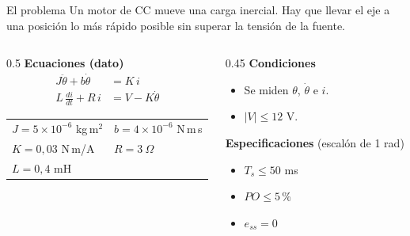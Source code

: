 \documentclass[11pt,aspectratio=169]{beamer}
\begin{document}
\begin{frame}{El problema}
  Un motor de CC mueve una carga inercial. Hay que llevar el eje a una posición
  lo más rápido posible sin superar la tensión de la fuente.

  \vspace{0.8em}
  \begin{columns}[T]
    \begin{column}{0.5\textwidth}
      \textbf{Ecuaciones (dato)}
      \begin{align*}
        J\ddot\theta + b\dot\theta &= K\,i\\
        L\,\frac{di}{dt} + R\,i &= V - K\dot\theta
      \end{align*}
      \small
      \begin{tabular}{@{}ll@{}}
        $J = 5\times10^{-6}$ kg\,m$^2$ & $b = 4\times10^{-6}$ N\,m\,s\\
        $K = 0{,}03$ N\,m/A & $R = 3\ \Omega$\\
        $L = 0{,}4$ mH &
      \end{tabular}
    \end{column}
    \begin{column}{0.45\textwidth}
      \textbf{Condiciones}
      \begin{itemize}
        \item Se miden $\theta$, $\dot\theta$ e $i$.
        \item $|V| \le 12$ V.
      \end{itemize}
      \vspace{0.5em}
      \textbf{Especificaciones} (escalón de 1 rad)
      \begin{itemize}
        \item $T_s \le 50$ ms
        \item $PO \le 5$\,\%
        \item $e_{ss} = 0$
      \end{itemize}
    \end{column}
  \end{columns}
\end{frame}
\end{document}

